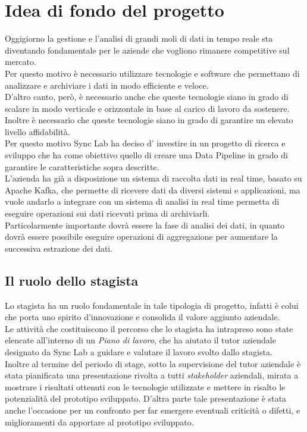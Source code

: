 \section{Idea di fondo del progetto}
Oggigiorno la gestione e l'analisi di grandi moli di dati in tempo reale sta diventando fondamentale 
per le aziende che vogliono rimanere competitive sul mercato. \\ 
Per questo motivo è necessario utilizzare tecnologie e software che permettano di analizzare e archiviare 
i dati in modo efficiente e veloce. \\
D'altro canto, però, è necessario anche che queste tecnologie siano in grado di scalare in modo verticale e orizzontale in base al carico 
di lavoro da sostenere. Inoltre è necessario che queste tecnologie siano in grado di garantire un elevato livello affidabilità. \\
Per questo motivo Sync Lab ha deciso d' investire in un progetto di ricerca e sviluppo che ha come obiettivo quello di creare 
una \gls{Data Pipeline}{} in grado di garantire le caratteristiche sopra descritte. \\
L'azienda ha già a disposizione un sistema di raccolta dati in  real time, basato su Apache Kafka, che permette di ricevere dati da
diversi sistemi e applicazioni, ma vuole andarlo a integrare con un sistema di analisi in real time permetta di eseguire operazioni 
sui dati ricevuti prima di archiviarli. \\
Particolarmente importante dovrà essere la fase di analisi dei dati, in quanto dovrà essere possibile eseguire operazioni di aggregazione
per aumentare la successiva estrazione dei dati. 
\subsection{Il ruolo dello stagista}
Lo stagista ha un ruolo fondamentale in tale tipologia di progetto, infatti è colui che porta uno spirito d'innovazione e consolida il valore aggiunto 
aziendale. \\
Le attività che costituiscono il percorso che lo stagista ha intrapreso sono state elencate all'interno di un \textit{Piano di lavoro}, che ha aiutato il tutor 
aziendale designato da Sync Lab a guidare e valutare il lavoro svolto dallo stagista. \\
Inoltre al termine del periodo di stage, sotto la supervisione del tutor aziendale è stata pianificata una presentazione rivolta a tutti \textit{stakeholder} aziendali, mirata a 
mostrare i risultati ottenuti con le tecnologie utilizzate e mettere in risalto le potenzialità del prototipo sviluppato. D'altra parte tale presentazione è stata anche l'occasione 
per un confronto per far emergere eventuali criticità o difetti,  e miglioramenti da apportare al prototipo sviluppato.
\pagebreak
